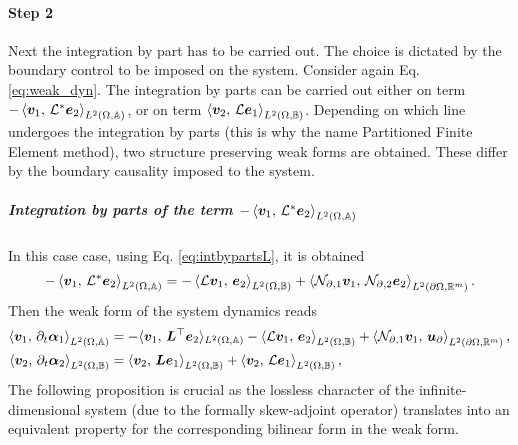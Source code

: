 \paragraph{Step 2} Next the integration by part has to be carried out. The choice is dictated by the boundary control to be imposed on the system. Consider again Eq. \eqref{eq:weak_dyn}. The integration by parts can be carried out either on term $-\inner[L^2(\Omega, \mathbb{A})]{\bm{v}_1}{\mathcal{L}^*\bm{e}_2}$, or on term $\inner[L^2(\Omega, \mathbb{B})]{\bm{v}_2}{\mathcal{L}\bm{e}_1}$. Depending on which line undergoes the integration by parts (this is why the name Partitioned Finite Element method), two structure preserving weak forms are obtained. These differ by the boundary causality imposed to the system. 


\subparagraph{Integration by parts of the term $-\inner[L^2(\Omega, \mathbb{A})]{\bm{v}_1}{\mathcal{L}^*\bm{e}_2}$}
In this case case, using Eq. \eqref{eq:intbypartsL}, it is obtained 
\begin{equation}
-\inner[L^2(\Omega, \mathbb{A})]{\bm{v}_1}{\mathcal{L}^*\bm{e}_2} = -\inner[L^2(\Omega, \mathbb{B})]{\mathcal{L}\bm{v}_1}{\bm{e}_2} + \inner[L^2(\partial \Omega, \mathbb{R}^m)]{\mathcal{N}_{\partial, 1} \bm{v}_1}{\mathcal{N}_{\partial, 2} \bm{e}_2}.
\end{equation}
Then the weak form of the system dynamics  reads 
\begin{equation}\label{eq:weak_dyn_intJ1}
\begin{aligned}
\inner[L^2(\Omega, \mathbb{A})]{\bm{v}_1}{\partial_t \bm{\alpha}_1} &=   -  \langle{\bm{v}_1}, \,{\bm{L}^\top \bm{e}_2}\rangle_{L^2(\Omega, \mathbb{A})}  -\inner[L^2(\Omega, \mathbb{B})]{\mathcal{L}\bm{v}_1}{\bm{e}_2} + \inner[L^2(\partial \Omega, \mathbb{R}^m)]{\mathcal{N}_{\partial, 1} \bm{v}_1}{\bm{u}_\partial}, \\
\inner[L^2(\Omega, \mathbb{B})]{\bm{v}_2}{\partial_t \bm{\alpha}_2} &=   \inner[L^2(\Omega, \mathbb{B})]{\bm{v}_2}{\bm{L}\bm{e}_1} + \inner[L^2(\Omega, \mathbb{B})]{\bm{v}_2}{\mathcal{L}\bm{e}_1},
\end{aligned}
\end{equation}
The following proposition is crucial as the lossless character of the infinite-dimensional system (due to the formally skew-adjoint operator) translates into an equivalent property for the corresponding bilinear form in the weak form.

